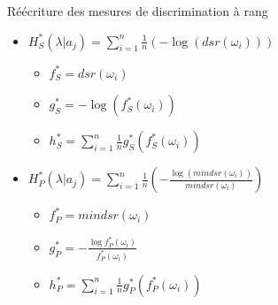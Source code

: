 \documentclass{beamer}
\newcommand{\myfrac}[2]{\frac{\displaystyle {#1}}{\displaystyle {#2}}}
\begin{document}
\begin{frame}{Réécriture des mesures de discrimination à rang}
    \begin{itemize}
        \item $H^*_S(\lambda|a_j) = \displaystyle\sum_{i=1}^{n}\myfrac{1}{n} (-\log(dsr(\omega_i)))$
        \begin{itemize}
            \item $f^*_S = dsr(\omega_i)$
            \item $g^*_S = -\log(f^*_S(\omega_i))$
            \item $h^*_S = \sum_{i=1}^{n} \myfrac{1}{n} g^*_S(f^*_S(\omega_i))$
        \end{itemize}
        \item $H^*_P(\lambda|a_j) = \displaystyle\sum_{i=1}^{n}\myfrac{1}{n} (-\myfrac{\log(mindsr(\omega_i))}{mindsr(\omega_i)})$
        \begin{itemize}
            \item $f^*_P = mindsr(\omega_i)$
            \item $g^*_P = -\myfrac{\log f^*_P(\omega_i)}{f^*_P(\omega_i)}$
            \item $h^*_P = \sum_{i=1}^{n} \myfrac{1}{n} g^*_P(f^*_P(\omega_i))$
        \end{itemize}
    \end{itemize}
\end{frame}
\end{document}

